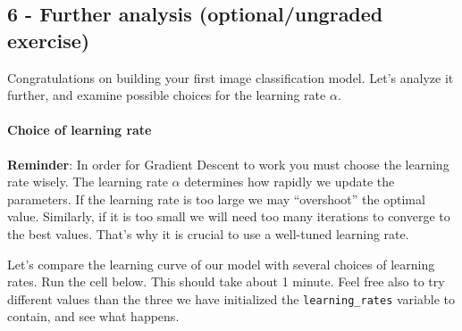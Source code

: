 \documentclass[11pt]{article}
\begin{document}
    \subsection{6 - Further analysis (optional/ungraded
exercise)}\label{further-analysis-optionalungraded-exercise}

Congratulations on building your first image classification model. Let's
analyze it further, and examine possible choices for the learning rate
$\alpha$.

    \paragraph{Choice of learning rate}\label{choice-of-learning-rate}

\textbf{Reminder}: In order for Gradient Descent to work you must choose
the learning rate wisely. The learning rate $\alpha$ determines how
rapidly we update the parameters. If the learning rate is too large we
may ``overshoot'' the optimal value. Similarly, if it is too small we
will need too many iterations to converge to the best values. That's why
it is crucial to use a well-tuned learning rate.

Let's compare the learning curve of our model with several choices of
learning rates. Run the cell below. This should take about 1 minute.
Feel free also to try different values than the three we have
initialized the \texttt{learning\_rates} variable to contain, and see
what happens.
\end{document}
